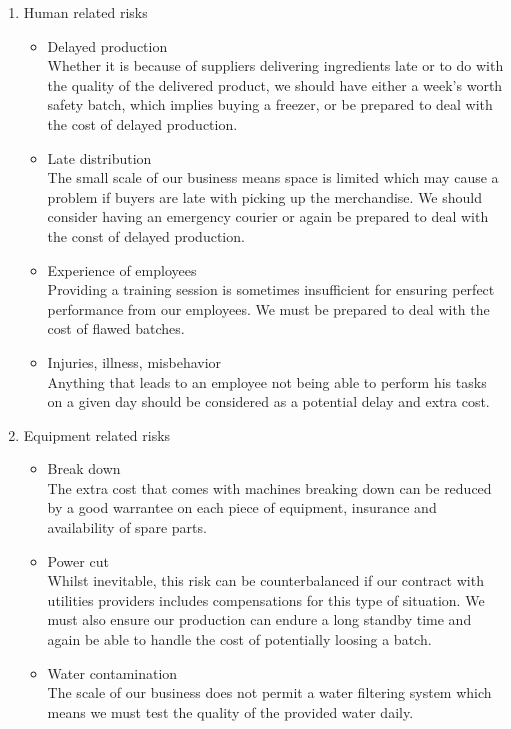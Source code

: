 \documentclass[11pt]{article}
\begin{document}
  \begin{enumerate}
  \item Human related risks
    \begin{itemize}
    \item Delayed production \\ Whether it is because of suppliers delivering ingredients late or to do with the quality of the delivered product, we should have either a week's worth safety batch, which implies buying a freezer, or be prepared to deal with the cost of delayed production.
    \item Late distribution \\
The small scale of our business means space is limited which may cause a problem if buyers are late with picking up the merchandise. We should consider having an emergency courier  or again be prepared to deal with the const of delayed production.
    \item Experience of employees \\
Providing a training session is sometimes insufficient for ensuring perfect performance from our employees. We must be prepared to deal with the cost of flawed batches.
    \item Injuries, illness, misbehavior \\
Anything that leads to an employee not being able to perform his tasks on a given day should be considered as a potential delay and extra cost.
    \end{itemize}

  \item Equipment related risks
    \begin{itemize}
    \item Break down \\
The extra cost that comes with machines breaking down can be reduced by a good warrantee on each piece of equipment, insurance and availability of spare parts.
    \item Power cut \\
Whilst inevitable, this risk can be counterbalanced if our contract with utilities providers includes compensations for this type of situation. We must also ensure our production can endure a long standby time and again be able to handle the cost of potentially loosing a batch.
    \item Water contamination \\
The scale of our business does not permit a water filtering system which means we must test the quality of the provided water daily.
    \end{itemize}


\end{enumerate}
\end{document}
